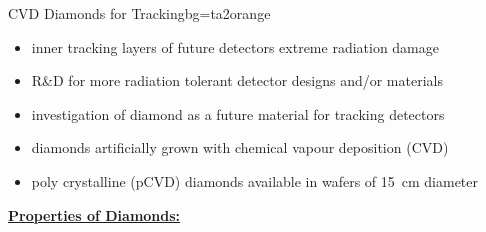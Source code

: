 \begin{variableblock}{CVD Diamonds for Tracking}{bg=ta2orange}{}
	\begin{itemize}
		\item inner tracking layers of future detectors \ra extreme radiation damage 
		\item R\&D for more radiation tolerant detector designs and/or materials
		\item investigation of diamond as a future material for tracking detectors
	\end{itemize}
	
	\hspace*{-3.5ex}
	\begin{minipage}{.57\linewidth}\vspace*{2ex}
		\begin{itemize}
			\item diamonds artificially grown with chemical vapour deposition (CVD)
			\item poly crystalline (pCVD) diamonds available in wafers of \SI{15}{\cm} diameter
		\end{itemize}
	\hfill
	\end{minipage}
	\begin{minipage}{.37\linewidth}
	\end{minipage}

	\textbf{\underline{Properties of Diamonds:}}
	\small{
		}\normalsize
		

\end{variableblock}
